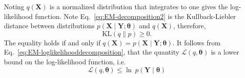 \documentclass[review,authoryear,3p]{elsarticle}
\begin{document}
Noting  $q(\mathbf X)$ is a normalized distribution that integrates to one gives the log-likelihood function. Note Eq.~\eqref{eq:EM-decomposition2} is the Kullback-Liebler distance between distributions $p(\mathbf X \mid \mathbf Y;\boldsymbol\theta)$ and $q(\mathbf X)$, therefore,
\begin{equation}
	\mathrm{KL}(q\parallel p)\ge 0.
\end{equation}   
The equality holds if and only if $q(\mathbf X)=p(\mathbf X \mid \mathbf Y;\boldsymbol\theta)$. It follows from  Eq.~\eqref{eq:EM-loglikelihooddecomposition}, that the quantity $\mathcal{L}(q,\boldsymbol\theta)$ is a lower bound on the log-likelihood function, i.e.
\begin{equation}
 \mathcal{L}(q,\boldsymbol\theta)\le \ln~p(\mathbf Y\mid\boldsymbol\theta)
	\end{equation} 
\end{document}
